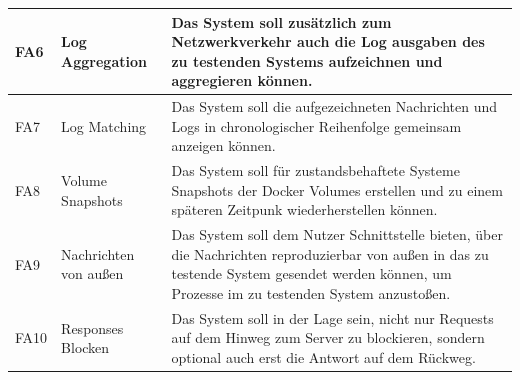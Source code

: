 \documentclass[12pt,a4paper]{report}
\begin{document}
\begin{table}[H]
\begin{tabular}{|l|l|p{7cm}|}
		FA6  & Log Aggregation               & Das System soll zusätzlich zum Netzwerkverkehr auch die Log ausgaben des zu testenden Systems aufzeichnen und aggregieren können.                                                                                     \\ \hline
		FA7  & Log Matching                  & Das System soll die aufgezeichneten Nachrichten und Logs in chronologischer Reihenfolge gemeinsam anzeigen können.                                                                                                    \\ \hline
		FA8  & Volume Snapshots              & Das System soll für zustandsbehaftete Systeme Snapshots der Docker Volumes erstellen und zu einem späteren Zeitpunk wiederherstellen können.                                                                          \\ \hline
		FA9  & Nachrichten von außen         & Das System soll dem Nutzer Schnittstelle bieten, über die Nachrichten reproduzierbar von außen in das zu testende System gesendet werden können, um Prozesse im zu testenden System anzustoßen.                       \\ \hline
		FA10 & Responses Blocken             & Das System soll in der Lage sein, nicht nur Requests auf dem Hinweg zum Server zu blockieren, sondern optional auch erst die Antwort auf dem Rückweg.                                                                 \\ \hline
	\end{tabular}
\end{table}
\end{document}
